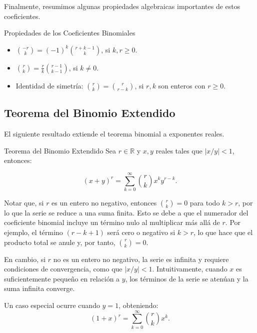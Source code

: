 Finalmente, resumimos algunas propiedades algebraicas importantes de estos coeficientes.
\begin{thmblock}{Propiedades de los Coeficientes Binomiales}
\begin{itemize}

\item $\displaystyle
  \binom{-r}{k} = (-1)^k \binom{r + k - 1}{k}$, si  $k,r\geq 0$.

\item $\displaystyle \binom{r}{k} = \frac{r}{k} \binom{r-1}{k-1}$, si $k \neq 0$.
\item Identidad de simetría: $\displaystyle \binom{r}{k} = \binom{r}{r-k}$, si $r, k$ son enteros con $r \geq 0$.
\end{itemize}
\end{thmblock}

\subsection{Teorema del Binomio Extendido}
El siguiente resultado extiende el teorema binomial a exponentes reales.
\begin{thmblock}{Teorema del Binomio Extendido}
Sea $r \in \mathbb{R}$ y $x,y$ reales tales que $|x/y|<1$, entonces:

$$
(x+y)^r = \sum_{k=0}^{\infty} \binom{r}{k} x^k y^{r-k}.
$$

\end{thmblock}
Notar que, si $r$ es un entero no negativo, entonces $\binom{r}{k} = 0$ para todo $k > r$, por lo que la serie se reduce a una suma finita.  Esto se debe a que el numerador del coeficiente binomial incluye un término nulo al multiplicar más allá de \( r \). Por ejemplo, el término \( (r - k + 1) \) será cero o negativo si \( k > r \), lo que hace que el producto total se anule y, por tanto, \( \binom{r}{k} = 0 \).
     
En cambio, si $r$ no es un entero no negativo, la serie es infinita y requiere condiciones de convergencia, como que $|x/y|<1$. Intuitivamente, cuando \( x \) es suficientemente pequeño en relación a \( y \), los términos de la serie se atenúan y la suma infinita converge. 


Un caso especial ocurre cuando $y = 1$, obteniendo:
$$(1+x)^r = \sum_{k=0}^{\infty} \binom{r}{k} x^k.$$


